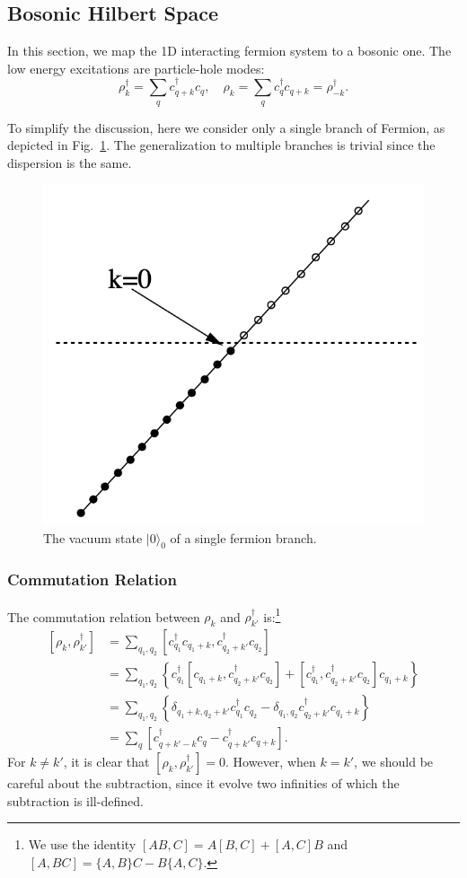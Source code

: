 \subsection{Bosonic Hilbert Space}

In this section, we map the 1D interacting fermion system to a bosonic one.
The low energy excitations are particle-hole modes:
\begin{equation}
	\rho_{k}^\dagger = \sum_{q} c_{q+k}^\dagger c_{q}, \quad
	\rho_{k} = \sum_{q} c_{q}^\dagger c_{q+k} = \rho_{-k}^\dagger.
\end{equation}

To simplify the discussion, here we consider only a single branch of Fermion, as depicted in Fig.~\ref{fig:bs-hilbert}. The generalization to multiple branches is trivial since the dispersion is the same.

\begin{figure}
	\centering
	\includegraphics[width=0.25\linewidth]{pics/FL-hilbert.png}
	\caption{The vacuum state $|0\rangle_0$ of a single fermion branch.}
	\label{fig:bs-hilbert}
\end{figure}

\subsubsection*{Commutation Relation}
The commutation relation between $\rho_k$ and $\rho_{k'}^\dagger$ is:\footnote{We use the identity $[AB,C] = A[B,C] + [A,C]B$ and $[A,BC]=\{A,B\}C - B\{A,C\}$.}
\begin{equation}
\begin{aligned}
	\left[\rho_{k}, \rho_{k'}^\dagger \right]
	&= \sum_{q_1, q_2} \left[c_{q_1}^\dagger c_{q_1+k}, c_{q_2+k'}^\dagger c_{q_2}\right] \\
	&= \sum_{q_1, q_2} \left\{c_{q_1}^\dagger \left[c_{q_1+k}, c_{q_2+k'}^\dagger c_{q_2}\right] +\left[c_{q_1}^\dagger, c_{q_2+k'}^\dagger c_{q_2}\right] c_{q_1+k}\right\} \\
	&= \sum_{q_1, q_2} \left\{ \delta_{q_1+k,q_2+k'} c_{q_1}^\dagger c_{q_2} -
		\delta_{q_1,q_2} c_{q_2+k'}^\dagger c_{q_1+k} \right\} \\
	&= \sum_{q}\left[c^\dagger_{q+k'-k} c_{q}-c^\dagger_{q+k'} c_{q+k}\right].
\end{aligned}
\end{equation}
For $k \ne k'$, it is clear that $[\rho_{k},\rho_{k'}^\dagger]=0$.
However, when $k = k'$, we should be careful about the subtraction, since it evolve two infinities of which the subtraction is ill-defined.

